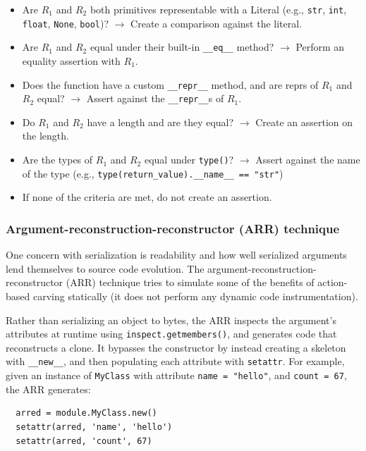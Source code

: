\begin{itemize}
  \item Are $R_1$ and $R_2$ both primitives representable with a Literal (e.g., \verb|str|, \verb|int|, \verb|float|, \verb|None|, \verb|bool|)? $\rightarrow$
        Create a comparison against the literal.
  \item Are $R_1$ and $R_2$ equal under their built-in \verb|__eq__| method? $\rightarrow$ Perform an equality assertion with $R_1$.
  \item Does the function have a custom \verb|__repr__| method, and are reprs of $R_1$ and $R_2$ equal? $\rightarrow$ Assert against the \verb|__repr__|s of $R_1$.
  \item Do $R_1$ and $R_2$ have a length and are they equal? $\rightarrow$ Create an assertion on the length.
  \item Are the types of $R_1$ and $R_2$ equal under \verb|type()|? $\rightarrow$ Assert against the name of the type (e.g., \verb|type(return_value).__name__ == "str"|)
  \item If none of the criteria are met, do not create an assertion.
\end{itemize}

\subsubsection{Argument-reconstruction-reconstructor (ARR) technique}

One concern with serialization is readability and how well serialized arguments lend themselves to source code evolution.
The argument-reconstruction-reconstructor (ARR) technique tries to simulate some of the benefits of action-based carving statically (it does not
perform any dynamic code instrumentation).

Rather than serializing an object to bytes, the ARR inspects the argument's attributes at runtime using \verb|inspect.getmembers()|, and
generates code that reconstructs a clone. It bypasses the constructor by instead creating a skeleton with \verb|__new__|, and then populating
each attribute with \verb|setattr|. For example, given an instance of \verb|MyClass| with attribute \verb|name = "hello"|, and \verb|count = 67|, the ARR generates:

\begin{verbatim}
  arred = module.MyClass.new()
  setattr(arred, 'name', 'hello')
  setattr(arred, 'count', 67)
\end{verbatim}

